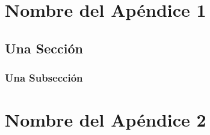 \documentclass[12pt,a4paper,oneside]{book}
\begin{document}
\appendix %

\chapter{Nombre del Apéndice 1}
\cite{girard1989}
\lipsum[1]	
\section{Una Sección}
\lipsum[2-3]
\subsection{Una Subsección}
\lipsum[4-6]

\chapter{Nombre del Apéndice 2} 
\lipsum[6-9]

\end{document}
